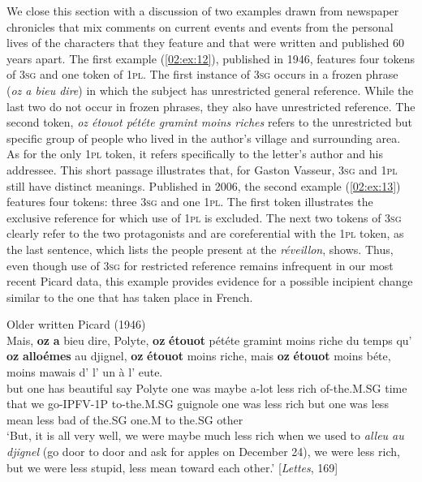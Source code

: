 \documentclass[output=paper,colorlinks,citecolor=brown]{langscibook}
\begin{document}
We close this section with a discussion of two examples drawn from newspaper chronicles that mix comments on current events and events from the personal lives of the characters that they feature and that were written and published 60 years apart. The first example (\ref{02:ex:12}), published in 1946, features four tokens of 3\textsc{sg} and one token of 1\textsc{pl}. The first instance of 3\textsc{sg} occurs in a frozen phrase (\textit{oz a bieu dire}) in which the subject has unrestricted general reference. While the last two  do not occur in frozen phrases, they also have unrestricted reference. The second token, \textit{oz étouot pététe gramint moins riches} refers to the unrestricted but specific group of people who lived in the author’s village and surrounding area. As for the only 1\textsc{pl} token, it refers specifically to the letter’s author and his addressee. This short passage illustrates that, for Gaston Vasseur, 3\textsc{sg} and 1\textsc{pl} still have distinct meanings. Published in 2006, the second example (\ref{02:ex:13}) features four tokens: three 3\textsc{sg} and one 1\textsc{pl}. The first token illustrates the exclusive reference for which use of 1\textsc{pl} is excluded. The next two tokens of 3\textsc{sg} clearly refer to the two protagonists and are coreferential with the 1\textsc{pl} token, as the last sentence, which lists the people present at the \textit{réveillon}, shows. Thus, even though use of 3\textsc{sg} for restricted reference remains infrequent in our most recent Picard data, this example provides evidence for a possible incipient change similar to the one that has taken place in French.

\ea \label{02:ex:12} Older written Picard (1946)\\
\gll Mais, \textbf{oz} \textbf{a} bieu dire, Polyte, \textbf{oz} \textbf{étouot} pététe  gramint moins riche du temps qu’ \textbf{oz} \textbf{alloémes} au djignel, \textbf{oz} \textbf{étouot} moins riche, mais \textbf{oz} \textbf{étouot} moins béte, moins  mawais d’ l’ un à l’ eute.\\
but one has beautiful say Polyte one was maybe  a-lot less rich of-the.M.SG  time that we go-IPFV-1P to-the.M.SG guignole one was less rich but one was less mean less bad of  the.SG one.M  to  the.SG  other\\ 
\glt ‘But, it is all very well, we were maybe much less rich when we used to \textit{alleu au djignel} (go door to door and ask for apples on December 24), we were less rich, but we were less stupid, less mean toward each other.’ [\textit{Lettes}, 169]
\z
\end{document}
